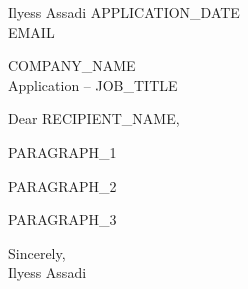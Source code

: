 \documentclass[11pt,a4paper]{article}
\begin{document}
Ilyess Assadi \hfill {{APPLICATION_DATE}}\\
{{EMAIL}}

\vspace{14pt}

{{COMPANY_NAME}}\\
Application -- {{JOB_TITLE}}

\vspace{6pt}

Dear {{RECIPIENT_NAME}},

{{PARAGRAPH_1}}

{{PARAGRAPH_2}}

{{PARAGRAPH_3}}

Sincerely,\\
Ilyess Assadi
\end{document}
